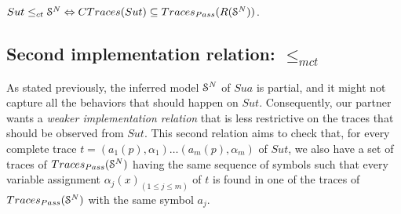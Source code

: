 \begin{proposition}
\label{rel:impl12}
${Sut} \leq_{ct} \EuScript{S}^{N} \Leftrightarrow CTraces({Sut})
\subseteq  Traces_{Pass}(R(\EuScript{S}^{N}))$.
\end{proposition}

\subsection{Second implementation relation: $\leq_{mct}$}

As stated previously, the inferred model $\EuScript{S}^{N}$ of
$\mathit{Sua}$ is partial, and it might not capture all the
behaviors that should happen on $\mathit{Sut}$. Consequently,
our partner wants a \emph{weaker implementation relation} that is
less restrictive on the traces that should be observed from
$\mathit{Sut}$. This second relation aims to
check that, for every complete trace $t=(a_1(p), \alpha_1) \dots
(a_m(p), \alpha_m)$ of $\mathit{Sut}$, we also have a set of traces of
$Traces_{Pass}(\EuScript{S}^{N})$ having the same sequence of
symbols such that every variable assignment $\alpha_j(x)_{(1 \leq
j \leq m)}$ of $t$ is found in one of the traces of
$Traces_{Pass}(\EuScript{S}^{N})$ with the same symbol $a_j$.

